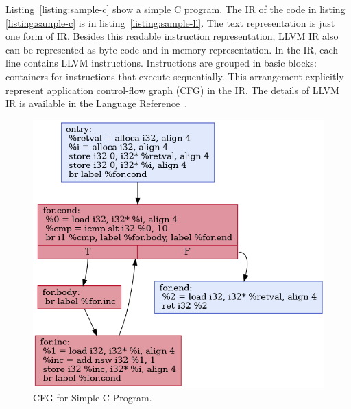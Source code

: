 
Listing~\ref{listing:sample-c} show a simple C program. The IR of the code in
listing \ref{listing:sample-c} is in listing~\ref{listing:sample-ll}. The text
representation is just one form of IR. Besides this readable instruction
representation, LLVM IR also can be represented as byte code and in-memory
representation. In the IR, each line contains LLVM instructions. Instructions
are grouped in basic blocks: containers for instructions that execute
sequentially. This arrangement explicitly represent application control-flow
graph (CFG) in the IR. The details of LLVM IR is available in the Language
Reference~\cite{LLVMLanguageReferencea}.



\begin{figure}[ht]
    \centerline{\includegraphics[scale=.75]{Figures/03/cfg.png}}
    \caption{CFG for Simple C Program.}
    \label{fig:cfg}
\end{figure}


